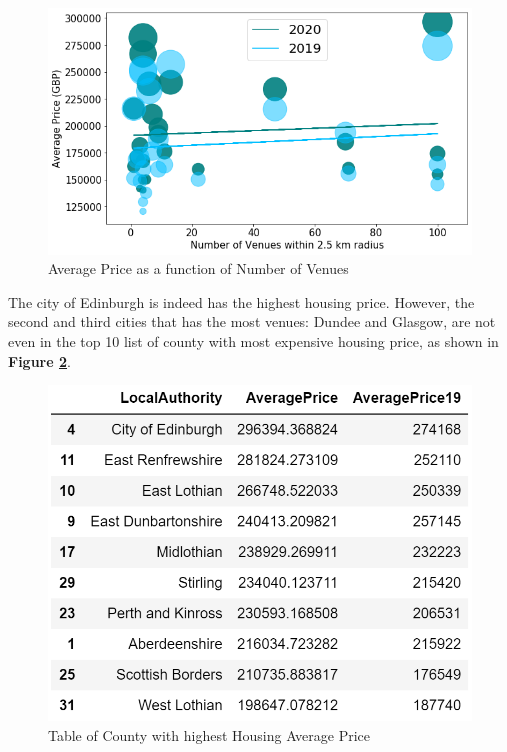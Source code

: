 \documentclass{homeworg}
\begin{document}
\begin{figure}[!h]
    \centering
    \includegraphics[scale=0.6]{figure/Figure_10b_NumOfVenues_VS_AveragePrice_yearly.png}
    \caption{Average Price as a function of Number of Venues}
    \label{fig:fig8}
\end{figure}
\FloatBarrier
The city of Edinburgh is indeed has the highest housing price. However, the second and third cities that has the most venues: Dundee and Glasgow, are not even in the top 10 list of county with most expensive housing price, as shown in \textbf{Figure \ref{fig:fig9}}. 
\begin{figure}[!h]
    \centering
    \includegraphics[scale=1]{figure/Table_of_10_highest_average_price.png}
    \caption{Table of County with highest Housing Average Price}
    \label{fig:fig9}
\end{figure}
\FloatBarrier
\end{document}
